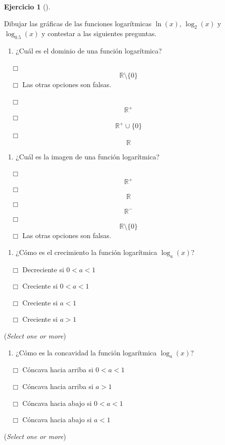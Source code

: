 \documentclass[
  a4paper,
]{scrreport}
\providecommand{\tightlist}{%
  \setlength{\itemsep}{0pt}\setlength{\parskip}{0pt}}\usepackage{longtable,booktabs,array}
\theoremstyle{definition}
\newtheorem{exercise}{Ejercicio}[chapter]
\theoremstyle{remark}
\begin{document}
\leavevmode{}%
\begin{exercise}[]\label{exr-funciones-logaritmicas}

Dibujar las gráficas de las funciones logarítmicas \(\ln(x)\),
\(\log_2(x)\) y \(\log_{0.5}(x)\) y contestar a las siguientes
preguntas.

\begin{enumerate}
\def\labelenumi{\alph{enumi}.}
\tightlist
\item
  ¿Cuál es el dominio de una función logarítmica?
\end{enumerate}

${\quad\Box}$ $$\mathbb{R}\setminus\{0\}$$
${\quad\Box}$ Las otras opciones son falsas.

${\quad\Box}$ $$\mathbb{R}^+$$
${\quad\Box}$ $$\mathbb{R}^+\cup \{0\}$$
${\quad\Box}$ $$\mathbb{R}$$

\begin{enumerate}
\def\labelenumi{\alph{enumi}.}
\setcounter{enumi}{1}
\tightlist
\item
  ¿Cuál es la imagen de una función logarítmica?
\end{enumerate}

${\quad\Box}$ $$\mathbb{R}^+$$
${\quad\Box}$ $$\mathbb{R}$$
${\quad\Box}$ $$\mathbb{R}^-$$
${\quad\Box}$ $$\mathbb{R}\setminus\{0\}$$
${\quad\Box}$ Las otras opciones son falsas.

\begin{enumerate}
\def\labelenumi{\alph{enumi}.}
\setcounter{enumi}{2}
\tightlist
\item
  ¿Cómo es el crecimiento la función logarítmica \(\log_a(x)\)?
\end{enumerate}

${\quad\Box}$ Decreciente si $0 < a <1$

${\quad\Box}$ Creciente si $0 < a < 1$

${\quad\Box}$ Creciente si $a<1$

${\quad\Box}$ Creciente si $a>1$

(\emph{Select one or more})

\begin{enumerate}
\def\labelenumi{\alph{enumi}.}
\setcounter{enumi}{3}
\tightlist
\item
  ¿Cómo es la concavidad la función logarítmica \(\log_a(x)\)?
\end{enumerate}

${\quad\Box}$ Cóncava hacia arriba si $0 < a < 1$

${\quad\Box}$ Cóncava hacia arriba si $a>1$

${\quad\Box}$ Cóncava hacia abajo si $0 < a < 1$

${\quad\Box}$ Cóncava hacia abajo si $a<1$

(\emph{Select one or more})

\end{exercise}
\end{document}
